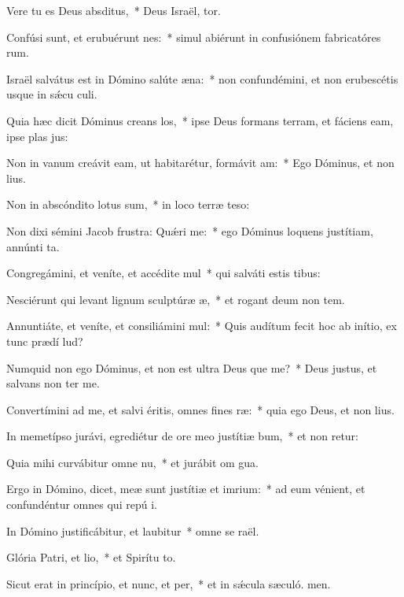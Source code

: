 \item Vere tu es Deus absditus,~* Deus Israël, tor.
\item Confúsi sunt, et erubuérunt nes:~* simul abiérunt in confusiónem fabricatóres rum.
\item Israël salvátus est in Dómino salúte æna:~* non confundémini, et non erubescétis usque in sǽcu culi.
\item Quia hæc dicit Dóminus creans los,~* ipse Deus formans terram, et fáciens eam, ipse plas jus:
\item Non in vanum creávit eam, ut habitarétur, formávit am:~* Ego Dóminus, et non  lius.
\item Non in abscóndito lotus sum,~* in loco terræ teso:
\item Non dixi sémini Jacob frustra: Quǽri me:~* ego Dóminus loquens justítiam, annúnti ta.
\item Congregámini, et veníte, et accédite mul~* qui salváti estis  tibus:
\item Nesciérunt qui levant lignum sculptúræ æ,~* et rogant deum non tem.
\item Annuntiáte, et veníte, et consiliámini mul:~* Quis audítum fecit hoc ab inítio, ex tunc prædí lud?
\item Numquid non ego Dóminus, et non est ultra Deus que me?~* Deus justus, et salvans non  ter me.
\item Convertímini ad me, et salvi éritis, omnes fines ræ:~* quia ego Deus, et non  lius.
\item In memetípso jurávi, egrediétur de ore meo justítiæ bum,~* et non retur:
\item Quia mihi curvábitur omne nu,~* et jurábit om gua.
\item Ergo in Dómino, dicet, meæ sunt justítiæ et imrium:~* ad eum vénient, et confundéntur omnes qui repú i.
\item In Dómino justificábitur, et laubitur~* omne se raël.
\item Glória Patri, et lio,~* et Spirítu to.
\item Sicut erat in princípio, et nunc, et per,~* et in sǽcula sæculó. men.
